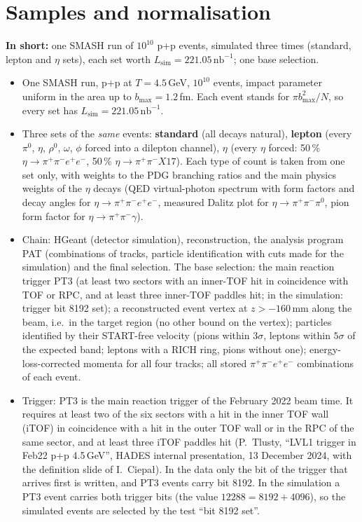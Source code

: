 \documentclass[11pt,a4paper]{article}
\newcommand{\piz}{\ensuremath{\pi^{0}}\xspace}
\newcommand{\pipi}{\ensuremath{\pi^{+}\pi^{-}}\xspace}
\newcommand{\ppee}{\ensuremath{\pi^{+}\pi^{-}e^{+}e^{-}}\xspace}
\newcommand{\nbinv}{\ensuremath{\mathrm{nb}^{-1}}\xspace}
\newcommand{\Lsim}{\ensuremath{L_{\mathrm{sim}}}\xspace}
\newcommand{\inshort}[1]{\par\noindent\colorbox{black!5}{\parbox{\dimexpr\linewidth-2\fboxsep\relax}{\textbf{In short:} #1}}\par}
\newcommand{\basesel}{the main reaction trigger PT3 (at least two sectors with an inner-TOF hit in coincidence with TOF or RPC, and at
least three inner-TOF paddles hit; in the simulation: trigger bit 8192 set); a reconstructed event vertex at
$z>-160$\,mm along the beam, i.e.\ in the target region (no other bound on the vertex); particles identified by their START-free
velocity (pions within $3\sigma$, leptons within $5\sigma$ of the expected band; leptons with a RICH ring, pions without one);
energy-loss-corrected momenta for all four tracks; all stored \ppee combinations of each event}
\begin{document}
\bigskip
{}\par\nopagebreak
\makeatletter\@nobreaktrue\makeatother%

\section{Samples and normalisation}
\label{sec:samp}
\inshort{one SMASH run of $10^{10}$ p+p events, simulated three times (standard, lepton and $\eta$ sets), each set
worth $\Lsim = 221.05\,\nbinv$; one base selection.}
\begin{itemize}
\item One SMASH run, p+p at $T = 4.5$\,GeV, $10^{10}$ events, impact parameter uniform in the area up to
      $b_{\max} = 1.2$\,fm. Each event stands for $\pi b_{\max}^2/N$, so every set has $\Lsim = 221.05\,\nbinv$.
\item Three sets of the \emph{same} events: \textbf{standard} (all decays natural), \textbf{lepton} (every \piz, $\eta$,
      $\rho^0$, $\omega$, $\phi$ forced into a dilepton channel), \textbf{$\eta$} (every $\eta$ forced: 50\,\%
      $\eta\to\ppee$, 50\,\% $\eta\to\pipi X17$). Each type of count is taken from one set only, with weights to the PDG
      branching ratios and the main physics weights of the $\eta$ decays (QED virtual-photon spectrum with form factors
      and decay angles for $\eta\to\ppee$, measured Dalitz plot for $\eta\to\pipi\piz$, pion form factor for
      $\eta\to\pipi\gamma$).
\item Chain: HGeant (detector simulation), reconstruction, the analysis program PAT (combinations of tracks, particle
      identification with cuts made for the simulation) and the final selection. The base selection: \basesel.
\item Trigger: PT3 is the main reaction trigger of the February 2022 beam time. It requires at least two of the six sectors with a hit
      in the inner TOF wall (iTOF) in coincidence with a hit in the outer TOF wall or in the RPC of the same sector, and at least three
      iTOF paddles hit (P.~Tlusty, ``LVL1 trigger in Feb22 p+p 4.5\,GeV'', HADES internal presentation, 13 December 2024, with the
      definition slide of I.~Ciepa{\l}). In the data only the bit of the trigger that arrives first is written, and PT3 events carry
      bit 8192. In the simulation a PT3 event carries both trigger bits (the value $12288=8192+4096$), so the simulated events are
      selected by the test ``bit 8192 set''.
\end{itemize}
\end{document}
